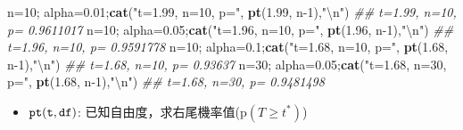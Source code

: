 \documentclass[hyperref,]{ctexart}
\newenvironment{Shaded}{\begin{snugshade}}{\end{snugshade}}
\newcommand{\CharTok}[1]{\textcolor[rgb]{0.31,0.60,0.02}{#1}}
\newcommand{\CommentTok}[1]{\textcolor[rgb]{0.56,0.35,0.01}{\textit{#1}}}
\newcommand{\DecValTok}[1]{\textcolor[rgb]{0.00,0.00,0.81}{#1}}
\newcommand{\FloatTok}[1]{\textcolor[rgb]{0.00,0.00,0.81}{#1}}
\newcommand{\KeywordTok}[1]{\textcolor[rgb]{0.13,0.29,0.53}{\textbf{#1}}}
\newcommand{\NormalTok}[1]{#1}
\newcommand{\StringTok}[1]{\textcolor[rgb]{0.31,0.60,0.02}{#1}}
\providecommand{\tightlist}{%
  \setlength{\itemsep}{0pt}\setlength{\parskip}{0pt}}
\begin{document}
\begin{Shaded}
\begin{Highlighting}[]
\NormalTok{n=}\DecValTok{10}\NormalTok{; alpha=}\FloatTok{0.01}\NormalTok{;}\KeywordTok{cat}\NormalTok{(}\StringTok{"t=1.99, n=10, p="}\NormalTok{, }\KeywordTok{pt}\NormalTok{(}\FloatTok{1.99}\NormalTok{, n}\DecValTok{-1}\NormalTok{),}\StringTok{"}\CharTok{\textbackslash{}n}\StringTok{"}\NormalTok{)}
\CommentTok{## t=1.99, n=10, p= 0.9611017}
\NormalTok{n=}\DecValTok{10}\NormalTok{; alpha=}\FloatTok{0.05}\NormalTok{;}\KeywordTok{cat}\NormalTok{(}\StringTok{"t=1.96, n=10, p="}\NormalTok{, }\KeywordTok{pt}\NormalTok{(}\FloatTok{1.96}\NormalTok{, n}\DecValTok{-1}\NormalTok{),}\StringTok{"}\CharTok{\textbackslash{}n}\StringTok{"}\NormalTok{)}
\CommentTok{## t=1.96, n=10, p= 0.9591778}
\NormalTok{n=}\DecValTok{10}\NormalTok{; alpha=}\FloatTok{0.1}\NormalTok{;}\KeywordTok{cat}\NormalTok{(}\StringTok{"t=1.68, n=10, p="}\NormalTok{, }\KeywordTok{pt}\NormalTok{(}\FloatTok{1.68}\NormalTok{, n}\DecValTok{-1}\NormalTok{),}\StringTok{"}\CharTok{\textbackslash{}n}\StringTok{"}\NormalTok{)}
\CommentTok{## t=1.68, n=10, p= 0.93637}
\NormalTok{n=}\DecValTok{30}\NormalTok{; alpha=}\FloatTok{0.05}\NormalTok{;}\KeywordTok{cat}\NormalTok{(}\StringTok{"t=1.68, n=30, p="}\NormalTok{, }\KeywordTok{pt}\NormalTok{(}\FloatTok{1.68}\NormalTok{, n}\DecValTok{-1}\NormalTok{),}\StringTok{"}\CharTok{\textbackslash{}n}\StringTok{"}\NormalTok{)}
\CommentTok{## t=1.68, n=30, p= 0.9481498}
\end{Highlighting}
\end{Shaded}

\begin{itemize}
\tightlist
\item
  \(\tt{pt(t, df)}\):
  已知自由度，求右尾機率值(\(\text{p}(T\geq t^{*})\))
\end{itemize}
\end{document}
